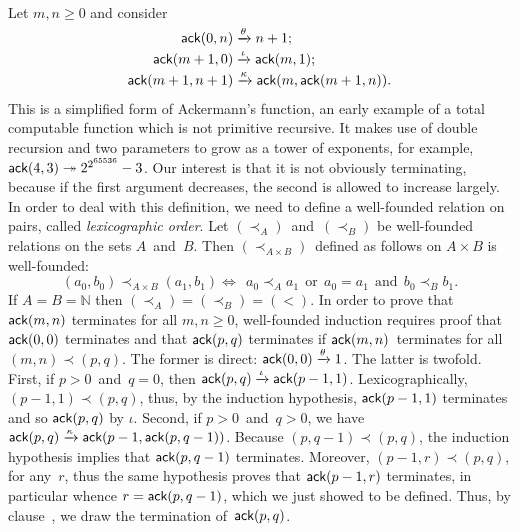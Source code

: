 Let \(m,n \geqslant 0\) and consider
\begin{align*}
\textsf{ack}(0,n)     &\xrightarrow{\smash{\theta}} n+1;\\
\textsf{ack}(m+1,0)   &\xrightarrow{\smash{\iota}} \textsf{ack}(m,1);\\
\textsf{ack}(m+1,n+1) &\xrightarrow{\smash{\kappa}} \textsf{ack}(m,\textsf{ack}(m+1,n)).
\end{align*}
This is a simplified form of Ackermann's function, an early example of
a total computable function which is not primitive recursive. It makes
use of double recursion and two parameters to grow as a tower of
exponents, for example, \(\textsf{ack}(4,3) \twoheadrightarrow
2^{2^{65536}} - 3\). Our interest is that it is not obviously
terminating, because if the first argument decreases, the second is
allowed to increase largely. In order to deal with this definition, we
need to define a well\hyp{}founded relation on pairs, called
\emph{lexicographic order}. Let \((\prec_A)\)~and~\((\prec_B)\) be
well\hyp{}founded relations on the sets \(A\)~and~\(B\). Then
\((\prec_{A \times B})\)~defined as follows on \({A \times B}\) is
well\hyp{}founded:
\begin{equation*}
(a_0,b_0) \prec_{A \times B} (a_1,b_1) \Leftrightarrow
  \,\; a_0 \prec_A a_1 \,\; \text{or} \,\; a_0 = a_1 \;\,\text{and}\,\;
  b_0 \prec_B b_1.
\end{equation*}
If \(A=B=\mathbb{N}\) then \((\prec_A) = (\prec_B) = (<)\). In order
to prove that \(\textsf{ack}(m,n)\) terminates for all \(m,n \geqslant
0\), well\hyp{}founded induction requires proof that
\(\textsf{ack}(0,0)\) terminates and that \(\textsf{ack}(p,q)\) terminates
if \(\textsf{ack}(m,n)\)~terminates for all~\((m,n) \prec (p,q)\). The
former is direct: \(\textsf{ack}(0,0) \xrightarrow{\smash{\theta}} 1\). The
latter is twofold. First, if \({p>0}\)~and~\({q=0}\), then
\(\textsf{ack}(p,q) \xrightarrow{\smash{\iota}}
\textsf{ack}(p-1,1)\). Lexicographically, \((p-1,1) \prec (p,q)\), thus,
by the induction hypothesis, \(\textsf{ack}(p-1,1)\) terminates and so
\(\textsf{ack}(p,q)\) by \(\iota\). Second, if \({p>0}\)~and~\({q>0}\),
we have \(\textsf{ack}(p,q) \xrightarrow{\smash{\kappa}}
\textsf{ack}(p-1,\textsf{ack}(p,q-1))\). Because \((p,q-1) \prec (p,q)\),
the induction hypothesis implies that \(\textsf{ack}(p,q-1)\)
terminates. Moreover, \((p-1,r) \prec (p,q)\), for any~\(r\), thus the
same hypothesis proves that \(\textsf{ack}(p-1,r)\) terminates, in
particular whence \(r=\textsf{ack}(p,q-1)\), which we just showed to be
defined. Thus, by clause~\clause{\kappa}, we draw the termination
of~\(\textsf{ack}(p,q)\).

